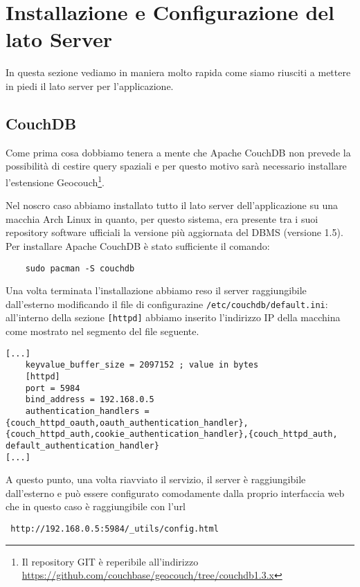 \appendix
\chapter{Installazione e Configurazione del lato Server}

    In questa sezione vediamo in maniera molto rapida come siamo riusciti a 
    mettere in piedi il lato server per l'applicazione.
    
    
    \section{CouchDB}
        
        Come prima cosa dobbiamo tenera a mente che Apache 
        CouchDB\texttrademark{} non prevede la possibilità di cestire query 
        spaziali e per questo motivo sarà necessario installare l'estensione 
        Geocouch\footnote{Il repository GIT è reperibile all'indirizzo 
        \url{https://github.com/couchbase/geocouch/tree/couchdb1.3.x}}.
        
        Nel noscro caso abbiamo installato tutto il lato server 
        dell'applicazione su una macchia Arch Linux in quanto, per questo 
        sistema, era presente tra i suoi repository software ufficiali la 
        versione più aggiornata del DBMS (versione 1.5). Per installare Apache 
        CouchDB\texttrademark{} è stato sufficiente il comando:
        \begin{lstlisting}
    sudo pacman -S couchdb
        \end{lstlisting}
        
        Una volta terminata l'installazione abbiamo reso 
        il server raggiungibile dall'esterno modificando il file di 
        configurazine \texttt{/etc/couchdb/default.ini}: all'interno della 
        sezione \verb|[httpd]| abbiamo inserito l'indirizzo IP della macchina 
        come mostrato nel segmento del file seguente.
        \begin{lstlisting}
[...]
    keyvalue_buffer_size = 2097152 ; value in bytes
    [httpd]
    port = 5984
    bind_address = 192.168.0.5
    authentication_handlers = {couch_httpd_oauth,oauth_authentication_handler},{couch_httpd_auth,cookie_authentication_handler},{couch_httpd_auth, default_authentication_handler}
[...]
        \end{lstlisting}
        A questo punto, una volta riavviato il servizio, il server è 
        raggiungibile dall'esterno e può essere configurato comodamente dalla 
        proprio interfaccia web che in questo caso è raggiungibile con l'url 
        \begin{lstlisting}
 http://192.168.0.5:5984/_utils/config.html
        \end{lstlisting}
        
